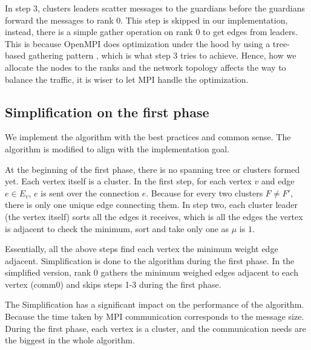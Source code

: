 \documentclass[english, 12pt, a4paper, elec, utf8, a-2b, online]{aaltothesis}
\begin{document}
In step 3, clusters leaders scatter messages to the guardians before the guardians forward the messages to rank 0. This step is skipped in our implementation, instead, there is a simple gather operation on rank 0 to get edges from leaders. This is because OpenMPI does optimization under the hood by using a tree-based gathering pattern \cite{MPICollective} \cite{OpenMPIRepoGather}, which is what step 3 tries to achieve. Hence, how we allocate the nodes to the ranks and the network topology affects the way to balance the traffic, it is wiser to let MPI handle the optimization.

\subsection{Simplification on the first phase}
We implement the algorithm with the best practices and common sense. The algorithm is modified to align with the implementation goal. 

At the beginning of the first phase, there is no spanning tree or clusters formed yet. Each vertex itself is a cluster. In the first step, for each vertex $v$ and edge $e \in E_v$, $e$ is sent over the connection $e$. 
Because for every two clusters $F \neq F'$, there is only one unique edge connecting them. 
In step two, each cluster leader (the vertex itself) sorts all the edges it receives, which is all the edges the vertex is adjacent to check the minimum, sort and take only one as $\mu$ is $1$. 

Essentially, all the above steps find each vertex the minimum weight edge adjacent. Simplification is done to the algorithm during the first phase. In the simplified version, rank 0 gathers the minimum weighed edges adjacent to each vertex (comm0) and skips steps 1-3 during the first phase. 

The Simplification has a significant impact on the performance of the algorithm. Because the time taken by MPI communication corresponds to the message size. During the first phase, each vertex is a cluster, and the communication needs are the biggest in the whole algorithm. 

\end{document}
